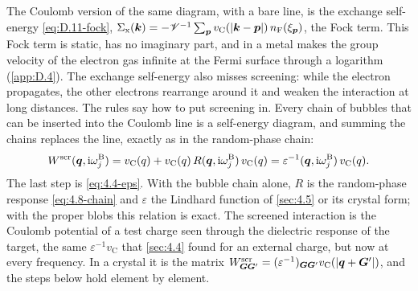The Coulomb version of the same diagram, with a bare line, is the exchange self-energy \cref{eq:D.11-fock}, $\Sigma_{\mathrm{x}}(\bm{k}) = -\mathscr{V}^{-1}\sum_{\bm{p}}v_{\mathrm{C}}(|\bm{k} - \bm{p}|)\,n_{\mathrm{F}}(\xi_{\bm{p}})$, the Fock term. This Fock term is static, has no imaginary part, and in a metal makes the group velocity of the electron gas infinite at the Fermi surface through a logarithm (\cref{app:D.4}). The exchange self-energy also misses screening: while the electron propagates, the other electrons rearrange around it and weaken the interaction at long distances. The rules say how to put screening in. Every chain of bubbles that can be inserted into the Coulomb line is a self-energy diagram, and summing the chains replaces the line, exactly as in the random-phase chain:
\begin{equation}
  W^{\mathrm{scr}}(\bm{q},\mathrm{i}\omega^{\mathrm{B}}_j) = v_{\mathrm{C}}(q) + v_{\mathrm{C}}(q)\,R(\bm{q},\mathrm{i}\omega^{\mathrm{B}}_j)\,v_{\mathrm{C}}(q) = \varepsilon^{-1}(\bm{q},\mathrm{i}\omega^{\mathrm{B}}_j)\,v_{\mathrm{C}}(q) .
  \label{eq:4.8-W}
\end{equation}
The last step is \cref{eq:4.4-eps}. With the bubble chain alone, $R$ is the random-phase response \cref{eq:4.8-chain} and $\varepsilon$ the Lindhard function of \cref{sec:4.5} or its crystal form; with the proper blobs this relation is exact. The screened interaction is the Coulomb potential of a test charge seen through the dielectric response of the target, the same $\varepsilon^{-1}v_{\mathrm{C}}$ that \cref{sec:4.4} found for an external charge, but now at every frequency. In a crystal it is the matrix $W^{\mathrm{scr}}_{\bm{G}\bm{G}'} = (\varepsilon^{-1})_{\bm{G}\bm{G}'}v_{\mathrm{C}}(|\bm{q}+\bm{G}'|)$, and the steps below hold element by element.

